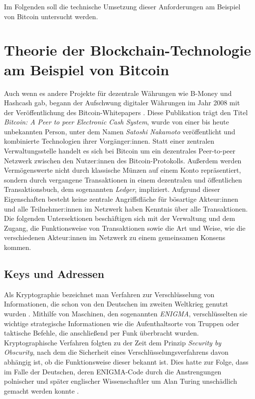 Im Folgenden soll die technische Umsetzung dieser Anforderungen am Beispiel von Bitcoin untersucht werden.
\section{Theorie der Blockchain-Technologie am Beispiel von Bitcoin}
Auch wenn es andere Projekte für dezentrale Währungen wie B-Money \cite[]{dai_1998} und Hashcash \cite[]{back_2002} gab, begann der Aufschwung digitaler Währungen im Jahr 2008 mit der Veröffentlichung des Bitcoin-Whitepapers  \cite{nakamoto_whitepaper_2008}. Diese Publikation trägt den Titel \emph{Bitcoin: A Peer to peer Electronic Cash System}, wurde von einer bis heute unbekannten Person, unter dem Namen \emph{Satoshi Nakamoto} veröffentlicht und kombinierte Technologien ihrer Vorgänger:innen. Statt einer zentralen Verwaltungsstelle handelt es sich bei Bitcoin um ein dezentrales Peer-to-peer Netzwerk zwischen den Nutzer:innen des Bitcoin-Protokolls. Außerdem werden Vermögenswerte nicht durch klassische Münzen auf einem Konto repräsentiert, sondern durch vergangene Transaktionen in einem dezentralen und öffentlichen Transaktionsbuch, dem sogenannten \emph{Ledger}, impliziert. Aufgrund dieser Eigenschaften besteht keine zentrale Angriffsfläche für bösartige Akteur:innen und alle Teilnehmer:innen im Netzwerk haben Kenntnis über alle Transaktionen. Die folgenden Untersektionen beschäftigen sich mit der Verwaltung und dem Zugang, die Funktionsweise von Transaktionen sowie die Art und Weise, wie die verschiedenen Akteur:innen im Netzwerk zu einem gemeinsamen Konsens kommen.
\subsection{Keys und Adressen}
Als Kryptographie bezeichnet man Verfahren zur Verschlüsselung von Informationen, die schon von den Deutschen im zweiten Weltkrieg genutzt wurden \cite[S. 19]{landwehr_2008}. 
Mithilfe von Maschinen, den sogenannten \emph{ENIGMA}, verschlüsselten sie wichtige strategische Informationen wie die Aufenthaltsorte von Truppen oder taktische Befehle, die anschließend per Funk überbracht wurden.
Kryptographische Verfahren folgten zu der Zeit dem Prinzip \emph{Security by Obscurity}, nach dem die Sicherheit eines Verschlüsselungsverfahrens davon abhängig ist, ob die Funktionsweise dieser bekannt ist. 
Dies hatte zur Folge, dass im Falle der Deutschen, deren ENIGMA-Code durch die Anstrengungen polnischer und später englischer Wissenschaftler um Alan Turing unschädlich gemacht werden konnte \cite[S. 18/19]{landwehr_2008}.\\

